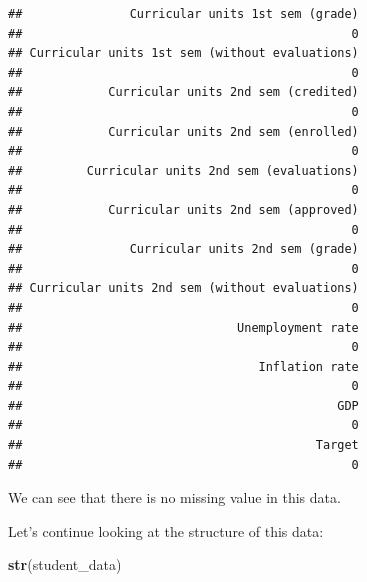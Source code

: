 \documentclass[
]{article}
\newenvironment{Shaded}{\begin{snugshade}}{\end{snugshade}}
\newcommand{\FunctionTok}[1]{\textcolor[rgb]{0.13,0.29,0.53}{\textbf{#1}}}
\newcommand{\NormalTok}[1]{#1}
\begin{document}
\begin{verbatim}
##               Curricular units 1st sem (grade) 
##                                              0 
## Curricular units 1st sem (without evaluations) 
##                                              0 
##            Curricular units 2nd sem (credited) 
##                                              0 
##            Curricular units 2nd sem (enrolled) 
##                                              0 
##         Curricular units 2nd sem (evaluations) 
##                                              0 
##            Curricular units 2nd sem (approved) 
##                                              0 
##               Curricular units 2nd sem (grade) 
##                                              0 
## Curricular units 2nd sem (without evaluations) 
##                                              0 
##                              Unemployment rate 
##                                              0 
##                                 Inflation rate 
##                                              0 
##                                            GDP 
##                                              0 
##                                         Target 
##                                              0
\end{verbatim}

We can see that there is no missing value in this data.

Let's continue looking at the structure of this data:

\begin{Shaded}
\begin{Highlighting}[]
\FunctionTok{str}\NormalTok{(student\_data)}
\end{Highlighting}
\end{Shaded}
\end{document}
